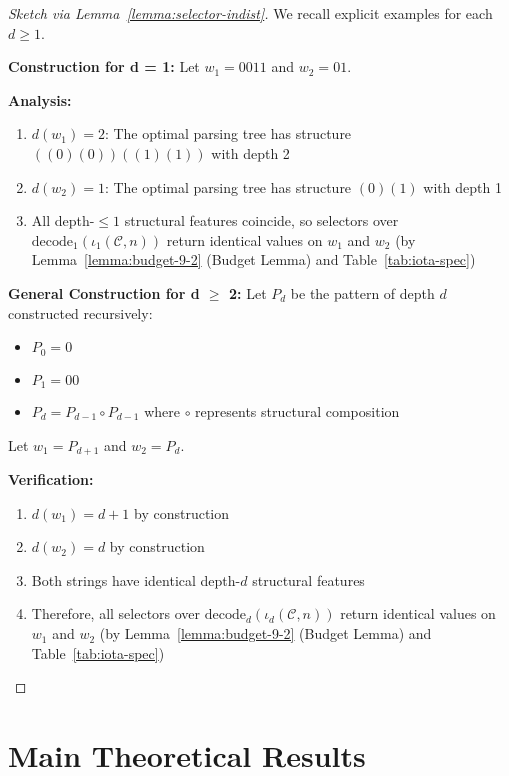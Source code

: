 
\begin{proof}[Sketch via Lemma~\ref{lemma:selector-indist}]
We recall explicit examples for each $d \geq 1$.

\textbf{Construction for d = 1:}
Let $w_1 = 0011$ and $w_2 = 01$.

\textbf{Analysis:}
\begin{enumerate}
\item $d(w_1) = 2$: The optimal parsing tree has structure $((0)(0))((1)(1))$ with depth 2
\item $d(w_2) = 1$: The optimal parsing tree has structure $(0)(1)$ with depth 1
\item All depth-$\le 1$ structural features coincide, so selectors over $\mathrm{decode}_1(\iota_1(\mathcal{C},n))$ return identical values on $w_1$ and $w_2$ (by Lemma~\ref{lemma:budget-9-2} (Budget Lemma) and Table~\ref{tab:iota-spec})
\end{enumerate}

\textbf{General Construction for d \ensuremath{\geq} 2:}
Let $P_d$ be the pattern of depth $d$ constructed recursively:
\begin{itemize}
\item $P_0 = 0$
\item $P_1 = 00$
\item $P_d = P_{d-1} \circ P_{d-1}$ where $\circ$ represents structural composition
\end{itemize}

Let $w_1 = P_{d+1}$ and $w_2 = P_d$.

\textbf{Verification:}
\begin{enumerate}
\item $d(w_1) = d+1$ by construction
\item $d(w_2) = d$ by construction
\item Both strings have identical depth-$d$ structural features
\item Therefore, all selectors over $\mathrm{decode}_d(\iota_d(\mathcal{C},n))$ return identical values on $w_1$ and $w_2$ (by Lemma~\ref{lemma:budget-9-2} (Budget Lemma) and Table~\ref{tab:iota-spec})
\end{enumerate}
\end{proof}

\section{Main Theoretical Results}

